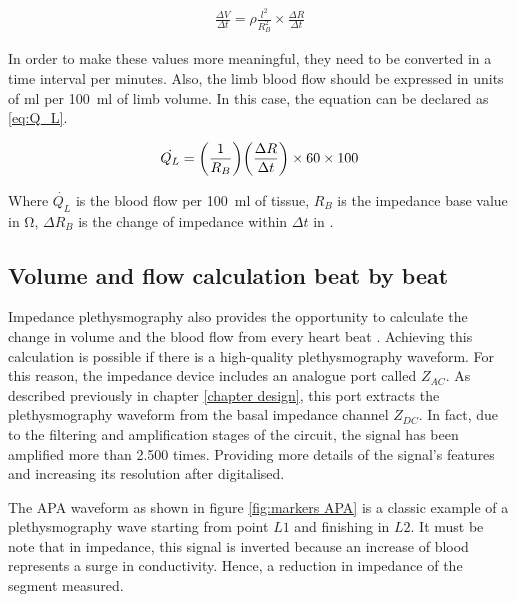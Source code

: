 \begin{align}
	\label{eq:DVDT}
	\frac{\Delta V}{\Delta t}= \rho \frac{l^2}{R_B^2} \times \frac{\Delta R}{\Delta t}
\end{align} 

In order to make these values more meaningful, they need to be converted in a time interval per minutes. Also, the limb blood flow should be expressed in units of \si{\milli\litre} per \SI{100}{\milli\litre} of limb volume. In this case, the equation can be declared as \ref{eq:Q_L}.

\begin{align}
	\label{eq:Q_L}
	\dot{Q_L} = \bigg( \frac{1}{R_B} \bigg) \bigg( \frac{\Delta R}{\Delta t} \bigg) \times 60  \times 100  \tagaddtext{[\si{ml/min.100.ml}]}
\end{align} 


Where $\dot{Q_L}$ is the blood flow per \SI{100}{\milli\litre} of tissue, $R_B$ is the impedance base value in \si{\ohm}, $\Delta R_B$ is the change of impedance within ${\Delta t}$ in \si{\sec}.

\subsection{Volume and flow calculation beat by beat}
\label{section procedure flow beat}
Impedance plethysmography also provides the opportunity to calculate the change in volume and the blood flow from every heart beat \cite{costeloe1980continuous,anderson1984impedance,mohapatra1981non,golden1986assessment}. Achieving this calculation is possible if there is a high-quality plethysmography waveform. For this reason, the impedance device includes an analogue port called $Z_{AC}$. As described previously in chapter \ref{chapter design}, this port extracts the plethysmography waveform from the basal impedance channel $Z_{DC}$. In fact, due to the filtering and amplification stages of the circuit, the signal has been amplified more than \num{2.500} times. Providing more details of the signal's features and increasing its resolution after digitalised.

The APA waveform as shown in figure \ref{fig:markers APA} is a classic example of a plethysmography wave starting from point $L1$ and finishing in $L2$. It must be note that in impedance, this signal is inverted because an increase of blood represents a surge in conductivity. Hence, a reduction in impedance of the segment measured. 

